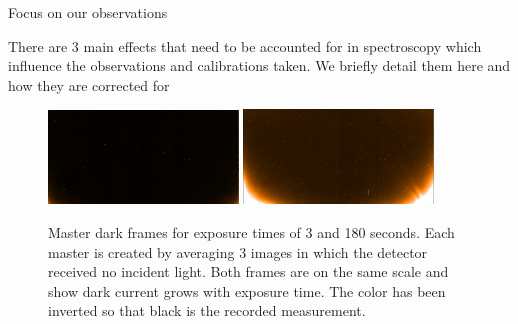 Focus on our observations

There are 3 main effects that need to be accounted for in \nir{} spectroscopy which influence the observations and calibrations taken. We briefly detail them here and how they are corrected for

\begin{figure}[h]
    \centering
    \includegraphics[width=0.45\textwidth]{figures/reduction/MasterDarkFlat_1.png}
    \includegraphics[width=0.45\textwidth]{figures/reduction/MasterDarkSpec_1.png}
    \caption{Master dark frames for exposure times of 3 and 180 seconds. Each master is created by averaging 3 images in which the detector received no incident light. Both frames are on the same scale and show dark current grows with exposure time. The color has been inverted so that black is the recorded measurement.}
    \label{fig:darkcurrent_colour}
\end{figure}

